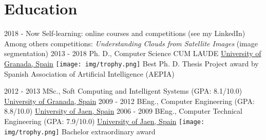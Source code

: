 \documentclass[letterpaper]{twentysecondcv} %
\begin{document}
\makeprofile %

\section{Education}

\begin{twenty} %
	\twentyitem
    	{2018 - Now}
        {}
        {Self-learning: online courses and competitions (see my LinkedIn)}
        {\href{}{}}
        {Among others competitions: \textit{Understanding Clouds from Satellite Images} (image segmentation)}
        {}
	\twentyitem
    	{2013 - 2018}
        {}
        {Ph. D., Computer Science \textnormal{CUM LAUDE}}
        {\href{http://www.ugr.es/}{University of Granada, Spain}}
        {{\texttt{[image: img/trophy.png]}} Best Ph. D. Thesis Project award by Spanish Association of
Artificial Intelligence (AEPIA)}
        {}
	
	\twentyitem
    	{2012 - 2013}
        {}
        {MSc., Soft Computing and Intelligent Systems \textnormal{(GPA: 8.1/10.0)}}
        {\href{http://www.ugr.es/}{University of Granada, Spain}}
        {}
        {}
	\twentyitem
    	{2009 - 2012}
		{}
        {BEng., Computer Engineering \textnormal{(GPA: 8.8/10.0)}}
        {\href{http://www.ujaen.es/}{University of Jaen, Spain}}
        {}
        {}
   \twentyitem
    	{2006 - 2009}
		{}
        {BEng., Computer Technical Engineering \textnormal{(GPA: 7.9/10.0)}}
        {\href{http://www.ujaen.es/}{University of Jaen, Spain}}
        {{\texttt{[image: img/trophy.png]}} Bachelor extraordinary award}
        {}
\end{twenty}

\end{document}
